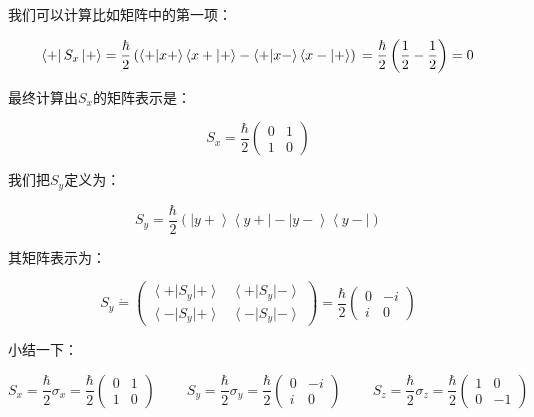 我们可以计算比如矩阵中的第一项：

\begin{equation}
\left\langle + \right| S_x \left| + \right\rangle = \frac{\hbar}{2} \left( \left\langle + | x+ \right\rangle \left\langle x+ | + \right\rangle - \left\langle + | x- \right\rangle \left\langle x- | + \right\rangle   \right) \\
{} = \frac{\hbar}{2} \left( \frac{1}{2} - \frac{1}{2} \right) = 0~
\end{equation}

最终计算出$S_x$的矩阵表示是：

\begin{equation}
S_x  = \frac{\hbar}{2} \left( \begin{array}{ccc} 0 &  1 \\ 1 & 0 \end{array} \right)~
\end{equation}

我们把$S_y$定义为：

\begin{equation}
S_y = \frac{\hbar}{2} \left( \left| y+ \right\rangle \left\langle y+ \right| - \left| y- \right\rangle \left\langle y- \right| \right)~
\end{equation}

其矩阵表示为：

\begin{equation}
S_y \dot = \left( \begin{array}{ccc}  \left\langle + \right| S_y \left| + \right\rangle  &  \left\langle + \right| S_y \left| - \right\rangle \\   \left\langle - \right| S_y \left| + \right\rangle  &   \left\langle - \right| S_y \left| - \right\rangle  \end{array} \right) = \frac{\hbar}{2} \left( \begin{array}{ccc} 0 &  -i \\ i & 0 \end{array} \right) ~
\end{equation}

小结一下：

\begin{equation}
S_x = \frac{\hbar}{2} \sigma_x =  \frac{\hbar}{2} \left( \begin{array}{ccc} 0 &  1 \\ 1 & 0 \end{array} \right)~ \qquad
S_y = \frac{\hbar}{2} \sigma_y = \frac{\hbar}{2} \left( \begin{array}{ccc} 0 &  -i \\ i & 0 \end{array} \right)~  \qquad
S_z = \frac{\hbar}{2} \sigma_z = \frac{\hbar}{2} \left( \begin{array}{ccc} 1 &  0 \\ 0 & -1 \end{array} \right)~
\end{equation}


